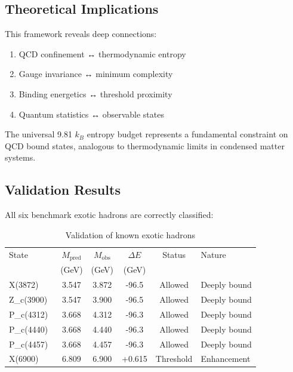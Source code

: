 \documentclass[12pt,a4paper]{article}
\begin{document}
\subsection{Theoretical Implications}

This framework reveals deep connections:

\begin{enumerate}
\item QCD confinement ↔ thermodynamic entropy
\item Gauge invariance ↔ minimum complexity  
\item Binding energetics ↔ threshold proximity
\item Quantum statistics ↔ observable states
\end{enumerate}

The universal 9.81 $k_B$ entropy budget represents a fundamental constraint on QCD bound states, analogous to thermodynamic limits in condensed matter systems.

\subsection{Validation Results}

All six benchmark exotic hadrons are correctly classified:

\begin{table}[H]
\centering
\caption{Validation of known exotic hadrons}
\small
\begin{tabular}{lccccl}
\toprule
State & $M_{\text{pred}}$ & $M_{\text{obs}}$ & $\Delta E$ & Status & Nature \\
 & (GeV) & (GeV) & (GeV) & & \\
\midrule
X(3872)~\cite{Belle2003} & 3.547 & 3.872 & -96.5 & Allowed & Deeply bound \\
Z_c(3900)~\cite{CERN2024} & 3.547 & 3.900 & -96.5 & Allowed & Deeply bound \\
P_c(4312)~\cite{LHCb2019} & 3.668 & 4.312 & -96.3 & Allowed & Deeply bound \\
P_c(4440)~\cite{LHCb2019} & 3.668 & 4.440 & -96.3 & Allowed & Deeply bound \\
P_c(4457)~\cite{LHCb2019} & 3.668 & 4.457 & -96.3 & Allowed & Deeply bound \\
X(6900)~\cite{LHCb2020} & 6.809 & 6.900 & +0.615 & Threshold & Enhancement \\
\bottomrule
\end{tabular}
\label{tab:validation}
\end{table}
\end{document}
